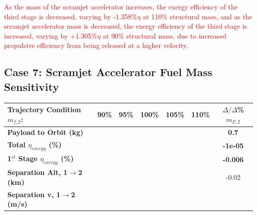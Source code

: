 \textcolor{red}{
As the mass of the scramjet accelerator increases, the exergy efficiency of the third stage is decreased, varying by -1.358\%$\eta$ at 110\% structural mass, and as the scramjet accelerator mass is decreased, the exergy efficiency of the third stage is increased, varying by +1.305\%$\eta$ at 90\% structural mass, due to increased propulsive efficiency from being released at a higher velocity. }


\subsection{Case 7: Scramjet Accelerator Fuel Mass Sensitivity} \label{sec:fuelmassNoReturn}

\begin{table}[!ht] %
\begin{tabular}{l c c c c c c} 
	\hline \textbf{Trajectory Condition}   \qquad  $m_{f,2}$:
	&90\%
	&95\%
	&100\%
	&105\%
	&110\%
	& $\Delta/\Delta$\%$m_{F,2}$
	\\
	\hline \textbf{Payload to Orbit (kg)}
	& \textbf{\PayloadToOrbitmFuelNinetyNoReturn}
	& \textbf{\PayloadToOrbitmFuelNinetyFiveNoReturn}
	& \textbf{\PayloadToOrbitmFuelStandardNoReturn}
	& \textbf{\PayloadToOrbitmFuelOneHundredFiveNoReturn}
	& \textbf{\PayloadToOrbitmFuelOneHundredTenNoReturn}
	&\textbf{0.7}
	\\
	\textbf{Total $\eta_{exergy}$ (\%)}
	& \textbf{\totalExergyEffmFuelNinetyNoReturn}
	& \textbf{\totalExergyEffmFuelNinetyFiveNoReturn}
	& \textbf{\totalExergyEffmFuelStandardNoReturn}
	& \textbf{\totalExergyEffmFuelOneHundredFiveNoReturn}
	& \textbf{\totalExergyEffmFuelOneHundredTenNoReturn}
	& \textbf{-1e-05}
	\\
	\hline 
	\textbf{1$^{st}$ Stage $\eta_{exergy}$ (\%)}
	& \textbf{\firstExergyEffmFuelNinetyNoReturn}
	& \textbf{\firstExergyEffmFuelNinetyFiveNoReturn}
	& \textbf{\firstExergyEffmFuelStandardNoReturn}
	& \textbf{\firstExergyEffmFuelOneHundredFiveNoReturn}
	& \textbf{\firstExergyEffmFuelOneHundredTenNoReturn}
	& \textbf{-0.006}
	\\
	\textbf{Separation Alt, 1$\rightarrow$2 (km)}
	& \firstsecondSeparationAltmFuelNinetyNoReturn
	& \firstsecondSeparationAltmFuelNinetyFiveNoReturn
	& \firstsecondSeparationAltmFuelStandardNoReturn
	& \firstsecondSeparationAltmFuelOneHundredFiveNoReturn
	& \firstsecondSeparationAltmFuelOneHundredTenNoReturn
	&-0.02
	\\
	\textbf{Separation v, 1$\rightarrow$2 (m/s)}
	& \firstsecondSeparationvmFuelNinetyNoReturn

\end{tabular}
\end{table}
